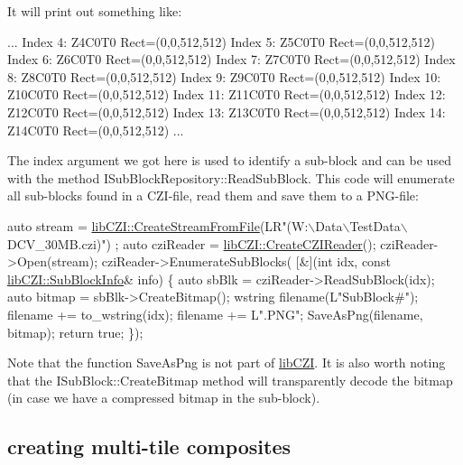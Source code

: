 It will print out something like\+: \begin{DoxyVerb}...
Index 4: Z4C0T0 Rect=(0,0,512,512)
Index 5: Z5C0T0 Rect=(0,0,512,512)
Index 6: Z6C0T0 Rect=(0,0,512,512)
Index 7: Z7C0T0 Rect=(0,0,512,512)
Index 8: Z8C0T0 Rect=(0,0,512,512)
Index 9: Z9C0T0 Rect=(0,0,512,512)
Index 10: Z10C0T0 Rect=(0,0,512,512)
Index 11: Z11C0T0 Rect=(0,0,512,512)
Index 12: Z12C0T0 Rect=(0,0,512,512)
Index 13: Z13C0T0 Rect=(0,0,512,512)
Index 14: Z14C0T0 Rect=(0,0,512,512)
...
\end{DoxyVerb}


The index argument we got here is used to identify a sub-\/block and can be used with the method {\ttfamily I\+Sub\+Block\+Repository\+::\+Read\+Sub\+Block}. This code will enumerate all sub-\/blocks found in a C\+Z\+I-\/file, read them and save them to a P\+N\+G-\/file\+:


\begin{DoxyCode}
\textcolor{keyword}{auto} stream = \hyperlink{namespacelib_c_z_i_a8783cf40c0eac418632db90c4f20b43b}{libCZI::CreateStreamFromFile}(LR\textcolor{stringliteral}{"(W:\(\backslash\)Data\(\backslash\)TestData\(\backslash\)DCV\_30MB.czi)")
      ;}
\textcolor{stringliteral}{}\textcolor{keyword}{auto} cziReader = \hyperlink{namespacelib_c_z_i_abe978d8bd50abe94c2d37df6212859e8}{libCZI::CreateCZIReader}();
cziReader->Open(stream);
cziReader->EnumerateSubBlocks(
    [&](\textcolor{keywordtype}{int} idx, \textcolor{keyword}{const} \hyperlink{structlib_c_z_i_1_1_sub_block_info}{libCZI::SubBlockInfo}& info)
\{
    \textcolor{keyword}{auto} sbBlk = cziReader->ReadSubBlock(idx);
    \textcolor{keyword}{auto} bitmap = sbBlk->CreateBitmap();
    wstring filename(L\textcolor{stringliteral}{"SubBlock#"});
    filename += to\_wstring(idx);
    filename += L\textcolor{stringliteral}{".PNG"};
    SaveAsPng(filename, bitmap);
    \textcolor{keywordflow}{return} \textcolor{keyword}{true};
\});
\end{DoxyCode}


Note that the function {\ttfamily Save\+As\+Png} is not part of \hyperlink{namespacelib_c_z_i}{lib\+C\+ZI}. It is also worth noting that the {\ttfamily I\+Sub\+Block\+::\+Create\+Bitmap} method will transparently decode the bitmap (in case we have a compressed bitmap in the sub-\/block).

\subsection*{creating multi-\/tile composites}

